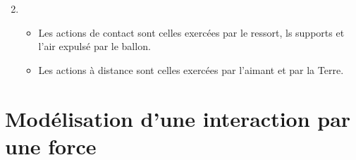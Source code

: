 \documentclass[xcolor={dvipsnames}]{beamer}
\begin{document}
\begin{frame}

\begin{enumerate}
	\setcounter{enumi}{1}
	

\item \begin{itemize}\pause
	\item Les actions de contact sont \pause celles exercées par le ressort, ls supports et l'air expulsé par le ballon.
	\item Les actions à distance sont \pause celles exercées par l'aimant et par la Terre. 
\end{itemize}
\end{enumerate}
%
%
%
\end{frame}

\begin{frame}
	
\end{frame}

\section{Modélisation d'une interaction par une force}
\end{document}
